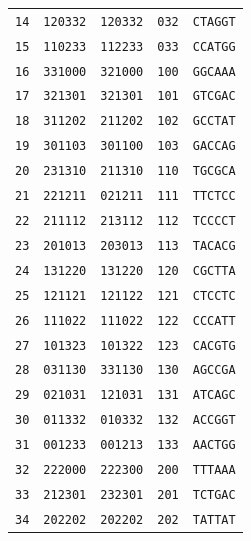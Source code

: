 \documentclass[a4paper,11pt]{article}
\begin{document}
\begin{table}[H]
\begin{center}
\begin{tabular}{rcccc}
\texttt{14} & \texttt{120332} & \texttt{120332} & \texttt{032} & \texttt{CTAGGT} \\
\texttt{15} & \texttt{110233} & \texttt{112233} & \texttt{033} & \texttt{CCATGG} \\
\texttt{16} & \texttt{331000} & \texttt{321000} & \texttt{100} & \texttt{GGCAAA} \\
\texttt{17} & \texttt{321301} & \texttt{321301} & \texttt{101} & \texttt{GTCGAC} \\
\texttt{18} & \texttt{311202} & \texttt{211202} & \texttt{102} & \texttt{GCCTAT} \\
\texttt{19} & \texttt{301103} & \texttt{301100} & \texttt{103} & \texttt{GACCAG} \\
\texttt{20} & \texttt{231310} & \texttt{211310} & \texttt{110} & \texttt{TGCGCA} \\
\texttt{21} & \texttt{221211} & \texttt{021211} & \texttt{111} & \texttt{TTCTCC} \\
\texttt{22} & \texttt{211112} & \texttt{213112} & \texttt{112} & \texttt{TCCCCT} \\
\texttt{23} & \texttt{201013} & \texttt{203013} & \texttt{113} & \texttt{TACACG} \\
\texttt{24} & \texttt{131220} & \texttt{131220} & \texttt{120} & \texttt{CGCTTA} \\
\texttt{25} & \texttt{121121} & \texttt{121122} & \texttt{121} & \texttt{CTCCTC} \\
\texttt{26} & \texttt{111022} & \texttt{111022} & \texttt{122} & \texttt{CCCATT} \\
\texttt{27} & \texttt{101323} & \texttt{101322} & \texttt{123} & \texttt{CACGTG} \\
\texttt{28} & \texttt{031130} & \texttt{331130} & \texttt{130} & \texttt{AGCCGA} \\
\texttt{29} & \texttt{021031} & \texttt{121031} & \texttt{131} & \texttt{ATCAGC} \\
\texttt{30} & \texttt{011332} & \texttt{010332} & \texttt{132} & \texttt{ACCGGT} \\
\texttt{31} & \texttt{001233} & \texttt{001213} & \texttt{133} & \texttt{AACTGG} \\
\texttt{32} & \texttt{222000} & \texttt{222300} & \texttt{200} & \texttt{TTTAAA} \\
\texttt{33} & \texttt{212301} & \texttt{232301} & \texttt{201} & \texttt{TCTGAC} \\
\texttt{34} & \texttt{202202} & \texttt{202202} & \texttt{202} & \texttt{TATTAT} \\

\end{tabular}
\end{center}
\end{table}
\end{document}
